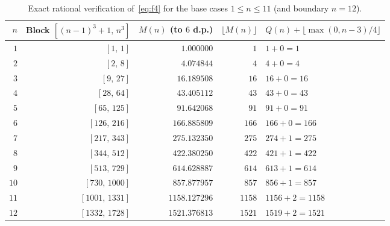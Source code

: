 \documentclass[11pt,a4paper]{article}
\theoremstyle{remark}
\begin{document}
\begin{table}[!htbp]
\centering
\caption{Exact rational verification of~\eqref{eq:f4} for the base cases $1 \le n \le 11$ (and boundary $n=12$).}
\label{tab:base-cases}
\begin{tabularx}{\linewidth}{r r r r X}
\toprule
$n$ & Block $[(n-1)^3+1,\, n^3]$ & $M(n)$ (to $6$ d.p.) & $\lfloor M(n) \rfloor$ & $Q(n) + \lfloor \max(0,n-3)/4 \rfloor$ \\
\midrule
$1$  & $[1,\, 1]$         & $1.000000$    & $1$    & $1 + 0 = 1$ \\
$2$  & $[2,\, 8]$         & $4.074844$    & $4$    & $4 + 0 = 4$ \\
$3$  & $[9,\, 27]$        & $16.189508$   & $16$   & $16 + 0 = 16$ \\
$4$  & $[28,\, 64]$       & $43.405112$   & $43$   & $43 + 0 = 43$ \\
$5$  & $[65,\, 125]$      & $91.642068$   & $91$   & $91 + 0 = 91$ \\
$6$  & $[126,\, 216]$     & $166.885809$  & $166$  & $166 + 0 = 166$ \\
$7$  & $[217,\, 343]$     & $275.132350$  & $275$  & $274 + 1 = 275$ \\
$8$  & $[344,\, 512]$     & $422.380250$  & $422$  & $421 + 1 = 422$ \\
$9$  & $[513,\, 729]$     & $614.628887$  & $614$  & $613 + 1 = 614$ \\
$10$ & $[730,\, 1000]$    & $857.877957$  & $857$  & $856 + 1 = 857$ \\
$11$ & $[1001,\, 1331]$   & $1158.127296$ & $1158$ & $1156 + 2 = 1158$ \\
$12$ & $[1332,\, 1728]$   & $1521.376813$ & $1521$ & $1519 + 2 = 1521$ \\
\bottomrule
\end{tabularx}
\end{table}
\end{document}
